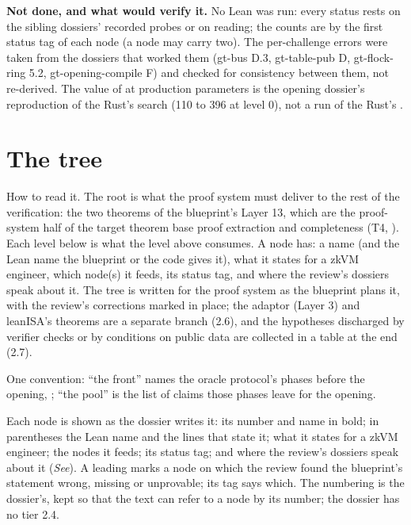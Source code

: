 \textbf{Not done, and what would verify it.} No Lean was run: every status rests on the sibling dossiers' recorded probes or on reading; the counts are by the first status tag of each node (a node may carry two). The per-challenge errors were taken from the dossiers that worked them (gt-bus D.3, gt-table-pub D, gt-flock-ring 5.2, gt-opening-compile F) and checked for consistency between them, not re-derived. The value of  at production parameters is the opening dossier's reproduction of the Rust's search (110 to 396 at level 0), not a run of the Rust's .

\endgroup

\section{The tree}\label{sec:obl-tree}

How to read it. The root is what the proof system must deliver to the rest of the verification: the two theorems of the blueprint's Layer 13, which are the proof-system half of the target theorem base proof extraction and completeness (T4, ). Each level below is what the level above consumes. A node has: a name (and the Lean name the blueprint or the code gives it), what it states for a zkVM engineer, which node(s) it feeds, its status tag, and where the review's dossiers speak about it. The tree is written for the proof system as the blueprint plans it, with the review's corrections marked in place; the adaptor (Layer 3) and leanISA's theorems are a separate branch (2.6), and the hypotheses discharged by verifier checks or by conditions on public data are collected in a table at the end (2.7).

One convention: ``the front'' names the oracle protocol's phases before the opening, ; ``the pool'' is the list of claims those phases leave for the opening.

Each node is shown as the dossier writes it: its number and name in bold; in parentheses the Lean name and the lines that state it; what it states for a zkVM engineer; the nodes it feeds; its status tag; and where the review's dossiers speak about it (\emph{See}). A leading \oblflag marks a node on which the review found the blueprint's statement wrong, missing or unprovable; its \oblreview{\ldots} tag says which. The numbering is the dossier's, kept so that the text can refer to a node by its number; the dossier has no tier 2.4.

